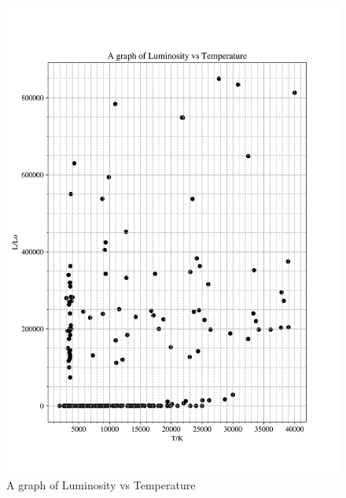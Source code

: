 \documentclass[12pt, a4paper]{article}
\begin{document}
\begin{figure}[H]
    \centering
    \includegraphics[width = \textwidth]{2Plot1.png}
    \caption{A graph of Luminosity vs Temperature}
\end{figure}
\end{document}
